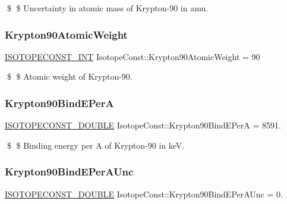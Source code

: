 \$ \$ Uncertainty in atomic mass of Krypton-\/90 in amu. \mbox{\label{group___isotope_const-_krypton-_kr90_ga8792e3fab77b6c1e98833df830b762b0}} 
\subsubsection{\texorpdfstring{Krypton90\+Atomic\+Weight}{Krypton90AtomicWeight}}
{\footnotesize\ttfamily \mbox{\hyperlink{group___isotope_const-_macros_ga5f18360b3e99483a35c32d789e62621c}{I\+S\+O\+T\+O\+P\+E\+C\+O\+N\+S\+T\+\_\+\+I\+NT}} Isotope\+Const\+::\+Krypton90\+Atomic\+Weight = 90}

\$ \$ Atomic weight of Krypton-\/90. \mbox{\label{group___isotope_const-_krypton-_kr90_gadb37e24717f0b380b5eaab87b1ca4508}} 
\subsubsection{\texorpdfstring{Krypton90\+Bind\+E\+PerA}{Krypton90BindEPerA}}
{\footnotesize\ttfamily \mbox{\hyperlink{group___isotope_const-_macros_ga8f45a7272ce02c0b4c65c44636ed719a}{I\+S\+O\+T\+O\+P\+E\+C\+O\+N\+S\+T\+\_\+\+D\+O\+U\+B\+LE}} Isotope\+Const\+::\+Krypton90\+Bind\+E\+PerA = 8591.}

\$ \$ Binding energy per A of Krypton-\/90 in keV. \mbox{\label{group___isotope_const-_krypton-_kr90_gaf386b7750d9bd570e91f124aa0b7cf55}} 
\subsubsection{\texorpdfstring{Krypton90\+Bind\+E\+Per\+A\+Unc}{Krypton90BindEPerAUnc}}
{\footnotesize\ttfamily \mbox{\hyperlink{group___isotope_const-_macros_ga8f45a7272ce02c0b4c65c44636ed719a}{I\+S\+O\+T\+O\+P\+E\+C\+O\+N\+S\+T\+\_\+\+D\+O\+U\+B\+LE}} Isotope\+Const\+::\+Krypton90\+Bind\+E\+Per\+A\+Unc = 0.}

